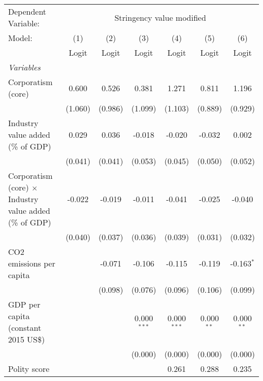 
\begingroup
\centering
\begin{tabular}{lcccccc}
   \toprule
   Dependent Variable: & \multicolumn{6}{c}{Stringency value modified}\\
   Model:                                                         & (1)     & (2)     & (3)           & (4)           & (5)          & (6)\\  
                                                                  &  Logit  & Logit   & Logit         & Logit         & Logit        & Logit\\  
   \midrule
   \emph{Variables}\\
   Corporatism (core)                                             & 0.600   & 0.526   & 0.381         & 1.271         & 0.811        & 1.196\\   
                                                                  & (1.060) & (0.986) & (1.099)       & (1.103)       & (0.889)      & (0.929)\\   
   Industry value added (\% of GDP)                               & 0.029   & 0.036   & -0.018        & -0.020        & -0.032       & 0.002\\   
                                                                  & (0.041) & (0.041) & (0.053)       & (0.045)       & (0.050)      & (0.052)\\   
   Corporatism (core) $\times$ Industry value added (\% of GDP)   & -0.022  & -0.019  & -0.011        & -0.041        & -0.025       & -0.040\\   
                                                                  & (0.040) & (0.037) & (0.036)       & (0.039)       & (0.031)      & (0.032)\\   
   CO2 emissions per capita                                       &         & -0.071  & -0.106        & -0.115        & -0.119       & -0.163$^{*}$\\   
                                                                  &         & (0.098) & (0.076)       & (0.096)       & (0.106)      & (0.099)\\   
   GDP per capita (constant 2015 US\$)                            &         &         & 0.000$^{***}$ & 0.000$^{***}$ & 0.000$^{**}$ & 0.000$^{**}$\\   
                                                                  &         &         & (0.000)       & (0.000)       & (0.000)      & (0.000)\\   
   Polity score                                                   &         &         &               & 0.261         & 0.288        & 0.235\\   

\end{tabular}
